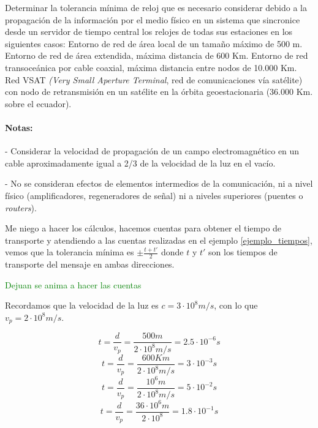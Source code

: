   \begin{problem}[11]
  Determinar la tolerancia mínima de reloj que es necesario considerar
  debido a la propagación de la información por el medio físico en un sistema
  que sincronice desde un servidor de tiempo central los relojes de todas
  sus estaciones en los siguientes casos:
    \ppart Entorno de red de área local de un tamaño máximo de 500 m.
    \ppart Entorno de red de área extendida, máxima distancia de 600 Km.
    \ppart Entorno de red transoceánica por cable coaxial, máxima distancia entre
nodos de 10.000 Km.
    \ppart Red VSAT \textit{(Very Small Aperture Terminal}, red de comunicaciones vía
satélite) con nodo de retransmisión en un satélite en la órbita geoestacionaria
(36.000 Km. sobre el ecuador).
  \paragraph{Notas: }
  - Considerar la velocidad de propagación de un campo electromagnético
en un cable aproximadamente igual a 2/3 de la velocidad de la luz en el
vacío.

  - No se consideran efectos de elementos intermedios de la comunicación,
  ni a nivel físico (amplificadores,  regeneradores de señal) ni a niveles
  superiores (puentes o \textit{routers}).

  \solution

  \yoP

  Me niego a hacer los cálculos, hacemos cuentas para obtener el tiempo de transporte y atendiendo a las cuentas realizadas en el ejemplo \ref{ejemplo_tiempos}, vemos que la tolerancia mínima es $\pm\frac{t+t'}{2}$ donde $t$ y $t'$ son los tiempos de transporte del mensaje en ambas direcciones.

\textcolor{green}{Dejuan se anima a hacer las cuentas}

Recordamos que la velocidad de la luz es $c=3·10^8 m/s$, con lo que $v_p=2·10^8m/s$. 

\spart
\[
t = \frac{d}{v_p} = \frac{500m}{2·10^8m/s} = 2.5·10^{-6}  s
\]
\spart
\[
t = \frac{d}{v_p} = \frac{600Km}{2·10^8m/s} = 3·10^{-3} s
\]
\spart
\[
t = \frac{d}{v_p} = \frac{10^6m}{2·10^8m/s} = 5·10^{-2} s
\]
\spart
\[
t = \frac{d}{v_p} = \frac{36·10^6m}{2·10^8} =  1.8·10^{-1} s
\]
  \end{problem}

